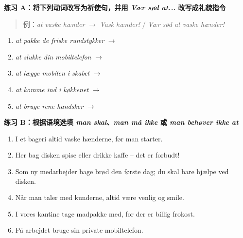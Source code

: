 
\textbf{练习 A：将下列动词改写为祈使句，并用 \textit{Vær sød at...} 改写成礼貌指令}
\begin{quote}
\small 例：\textit{at vaske hænder} $\rightarrow$ \textit{Vask hænder!} / \textit{Vær sød at vaske hænder!}
\end{quote}
\begin{enumerate}
  \item \textit{at pakke de friske rundstykker} $\rightarrow$ \underline{\hspace{5.5cm}}
  \item \textit{at slukke din mobiltelefon} $\rightarrow$ \underline{\hspace{5.5cm}}
  \item \textit{at lægge mobilen i skabet} $\rightarrow$ \underline{\hspace{5.5cm}}
  \item \textit{at komme ind i køkkenet} $\rightarrow$ \underline{\hspace{5.5cm}}
  \item \textit{at bruge rene handsker} $\rightarrow$ \underline{\hspace{5.5cm}}
\end{enumerate}

\textbf{练习 B：根据语境选填 \textit{man skal}、\textit{man må ikke} 或 \textit{man behøver ikke at}}
\begin{enumerate}
  \item I et bageri \underline{\hspace{3.2cm}} altid vaske hænderne, før man starter.
  \item Her bag disken \underline{\hspace{3.2cm}} spise eller drikke kaffe – det er forbudt!
  \item Som ny medarbejder \underline{\hspace{3.2cm}} bage brød den første dag; du skal bare hjælpe ved disken.
  \item Når man taler med kunderne, \underline{\hspace{3.2cm}} altid være venlig og smile.
  \item I vores kantine \underline{\hspace{3.2cm}} tage madpakke med, for der er billig frokost.
  \item På arbejdet \underline{\hspace{3.2cm}} bruge sin private mobiltelefon.
\end{enumerate}

